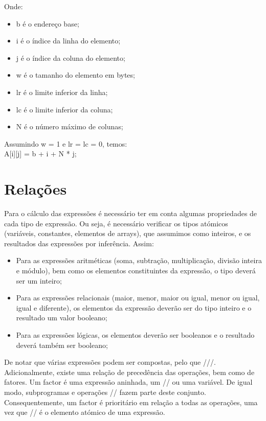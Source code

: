 Onde:

\begin{itemize}
\item b é o endereço base;
\item i é o índice da linha do elemento;
\item j é o índice da coluna do elemento;
\item w é o tamanho do elemento em bytes;
\item lr é o limite inferior da linha;
\item lc é o limite inferior da coluna;
\item N é o número máximo de colunas;
\end{itemize}

Assumindo w = 1 e lr = lc = 0, temos:\\

A[i][j] = b + i + N * j;\\


\section{Relações}
\label{sec:relacoes:analise}

Para o cálculo das expressões é necessário ter em conta algumas propriedades de cada tipo de expressão. Ou seja, é necessário verificar os tipos atómicos (variáveis, constantes, elementos de arrays), que assumimos como inteiros, e os resultados das expressões por inferência. Assim:\\
\begin{itemize}
\item Para as expressões aritméticas (soma, subtração, multiplicação, divisão inteira e módulo), bem como os elementos constituintes da expressão, o tipo deverá ser um inteiro;
\item Para as expressões relacionais (maior, menor, maior ou igual, menor ou igual, igual e diferente), os elementos da expressão deverão ser do tipo inteiro e o resultado um valor booleano;
\item Para as expressões lógicas, os elementos deverão ser booleanos e o resultado deverá também ser booleano;
\end{itemize}

De notar que várias expressões podem ser compostas, pelo que ///. Adicionalmente, existe uma relação de precedência das operações, bem como de fatores. Um factor é uma expressão aninhada, um // ou uma variável. De igual modo, subprogramas e operações // fazem parte deste conjunto. Consequentemente, um factor é prioritário em relação a todas as operações, uma vez que // é o elemento atómico de uma expressão.\\


